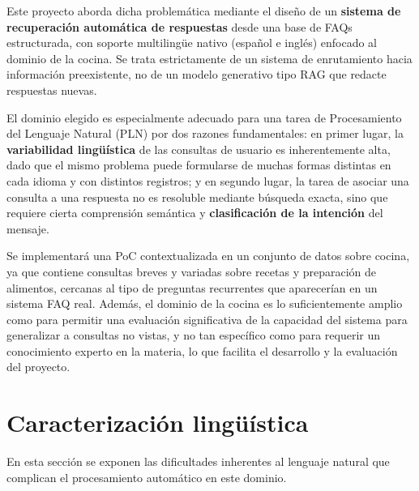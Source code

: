 \documentclass[11pt,a4paper,twoside]{article}
\theoremstyle{definition}
\numberwithin{equation}{section}
\begin{document}
Este proyecto aborda dicha problemática mediante el diseño de un \textbf{sistema de recuperación automática de respuestas} desde una base de FAQs estructurada, con soporte multilingüe nativo (español e inglés) enfocado al dominio de la cocina. Se trata estrictamente de un sistema de enrutamiento hacia información preexistente, no de un modelo generativo tipo RAG que redacte respuestas nuevas.

El dominio elegido es especialmente adecuado para una tarea de Procesamiento del Lenguaje Natural (PLN) por dos razones fundamentales: en primer lugar, la \textbf{variabilidad lingüística} de las consultas de usuario es inherentemente alta, dado que el mismo problema puede formularse de muchas formas distintas en cada idioma y con distintos registros; y en segundo lugar, la tarea de asociar una consulta a una respuesta no es resoluble mediante búsqueda exacta, sino que requiere cierta comprensión semántica y \textbf{clasificación de la intención} del mensaje. 

Se implementará una PoC contextualizada en un conjunto de datos sobre cocina, ya que contiene consultas breves y variadas sobre recetas y preparación de alimentos, cercanas al tipo de preguntas recurrentes que aparecerían en un sistema FAQ real. Además, el dominio de la cocina es lo suficientemente amplio como para permitir una evaluación significativa de la capacidad del sistema para generalizar a consultas no vistas, y no tan específico como para requerir un conocimiento experto en la materia, lo que facilita el desarrollo y la evaluación del proyecto.


\section{Caracterización lingüística} \label{sec2}
En esta sección se exponen las dificultades inherentes al lenguaje natural que complican el procesamiento automático en este dominio.
\end{document}

